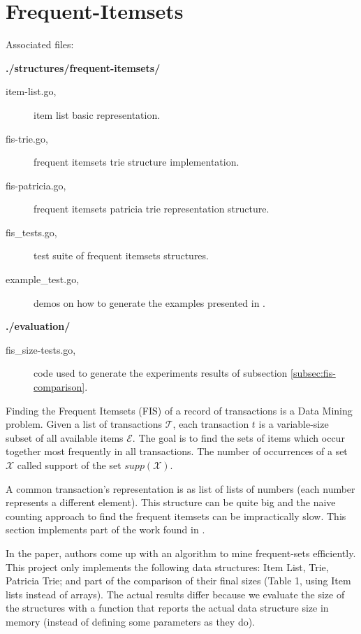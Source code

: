 \documentclass[a4paper,10pt,table,xcdraw]{article}
\begin{document}
\section{Frequent-Itemsets}
\label{sec:fis}

Associated files:

\textbf{./structures/frequent-itemsets/}
\begin{description}
\item [\hspace{10mm} item-list.go,] item list basic representation.
\item [\hspace{10mm} fis-trie.go,] frequent itemsets trie  structure implementation.
\item [\hspace{10mm} fis-patricia.go,] frequent itemsets patricia trie representation structure.
\item [\hspace{10mm} fis\_tests.go,] test suite of frequent itemsets structures.
\item [\hspace{10mm} example\_test.go,] demos on how to generate the examples presented in \cite{Pietracaprina2003}.
\end{description}
\textbf{./evaluation/}
\begin{description}
\item [\hspace{10mm} fis\_size-tests.go,] code used to generate the experiments results of subsection \ref{subsec:fis-comparison}.
\end{description}


Finding the Frequent Itemsets (FIS) of a record of transactions is a Data Mining problem. Given a list of transactions $\mathcal{T}$, each transaction $t$ is a variable-size subset of all available items $\mathcal{E}$. The goal is to find the sets of items which occur together most frequently in all transactions. The number of occurrences of a set $\mathcal{X}$ called support of the set $supp(\mathcal{X})$.

A common transaction's representation is as list of lists of numbers (each number represents a different element). This structure can be quite big and the naive counting approach to find the frequent itemsets can be impractically slow. This section implements part of the work found in \cite{Pietracaprina2003}.

In the paper, authors come up with an algorithm to mine frequent-sets efficiently. This project only implements the following data structures: Item List, Trie, Patricia Trie; and part of the comparison of their final sizes (Table 1, using Item lists instead of arrays). The actual results differ because we evaluate the size of the structures with a function that reports the actual data structure size in memory (instead of defining some parameters as they do).
\end{document}
